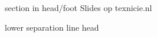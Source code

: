 {\begin{beamercolorbox}{section in head/foot}
        \hfil
        Slides op texnicie.nl
        \vskip4pt
    \end{beamercolorbox}%
    \begin{beamercolorbox}[colsep=1.5pt]{lower separation line head}%
    \end{beamercolorbox}%
}